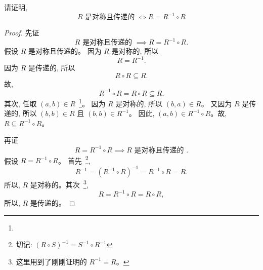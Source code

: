 \documentclass[a4paper, justified]{tufte-handout}
\begin{document}
\begin{problem}
  请证明,
  \[
    R \text{ 是对称且传递的 } \iff R = R^{-1} \circ R
  \]
\end{problem}

\begin{proof}
  先证
  \[
    R \text{ 是对称且传递的 } \implies R = R^{-1} \circ R.
  \]
  假设 $R$ 是对称且传递的。
  因为 $R$ 是对称的, 所以
  \[
    R = R^{-1}.
  \]
  因为 $R$ 是传递的, 所以
  \[
    R \circ R \subseteq R.
  \]
  故,
  \[
    R^{-1} \circ R = R \circ R \subseteq R.
  \]
  其次, 任取 $(a, b) \in R$~\footnote{\vspace{1em}}。
  因为 $R$ 是对称的, 所以 $(b, a) \in R$。
  又因为 $R$ 是传递的, 所以 $(b, b) \in R$ 且 $(b, b) \in R^{-1}$。
  因此, $(a, b) \in R^{-1} \circ R$。故, $R \subseteq R^{-1} \circ R$。

  再证
  \[
     R = R^{-1} \circ R \implies R \text{ 是对称且传递的 }.
  \]
  假设 $R = R^{-1} \circ R$。
  首先~\footnote{切记: $(R \circ S)^{-1} = S^{-1} \circ R^{-1}$},
  \[
    R^{-1} = (R^{-1} \circ R)^{-1} = R^{-1} \circ R = R.
  \]
  所以, $R$ 是对称的。其次~\footnote{这里用到了刚刚证明的 $R^{-1} = R$。},
  \[
    R = R^{-1} \circ R = R \circ R,
  \]
  所以, $R$ 是传递的。




\end{proof}
\end{document}
